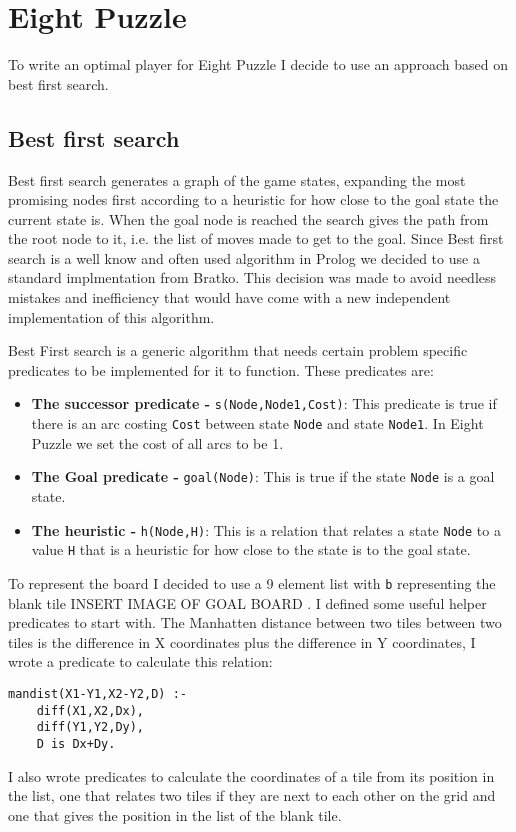 \documentclass[a4paper,12pt]{report}
\begin{document}
\section{Eight Puzzle}
To write an optimal player for Eight Puzzle I decide to use an approach based on best first search.
\subsection{Best first search}
Best first search generates a graph of the game states, expanding the most promising nodes first according to a heuristic for how close to the goal state the current state is. When the goal node is reached the search gives the path from the root node to it, i.e. the list of moves made to get to the goal.
Since Best first search is a well know and often used algorithm in Prolog we decided to use a standard implmentation from Bratko\cite{Bratko}. This decision was made to avoid needless mistakes and inefficiency that would have come with a new independent implementation of this algorithm.

Best First search is a generic algorithm that needs certain problem specific predicates to be implemented for it to function. These predicates are:
\begin{itemize}
\item \textbf{The successor predicate - }\texttt{s(Node,Node1,Cost)}: This predicate is true if there is an arc costing \texttt{Cost} between state \texttt{Node} and state \texttt{Node1}. In Eight Puzzle we set the cost of all arcs to be 1.
\item \textbf{The Goal predicate - }\texttt{goal(Node)}: This is true if the state \texttt{Node} is a goal state.
\item \textbf{The heuristic - }\texttt{h(Node,H)}: This is a relation that relates a state \texttt{Node} to a value \texttt{H} that is a heuristic for how close to the state is to the goal state.
\end{itemize}
To represent the board I decided to use a 9 element list with \texttt{b} representing the blank tile INSERT IMAGE OF GOAL BOARD .
I defined some useful helper predicates to start with. The Manhatten distance between two tiles between two tiles is the difference in X coordinates plus the difference in Y coordinates, I wrote a predicate to calculate this relation:
\begin{verbatim}
mandist(X1-Y1,X2-Y2,D) :-
    diff(X1,X2,Dx),
    diff(Y1,Y2,Dy),
    D is Dx+Dy.
\end{verbatim}
I also wrote predicates to calculate the coordinates of a tile from its position in the list, one that relates two tiles if they are next to each other on the grid and one that gives the position in the list of the blank tile.
\end{document}
